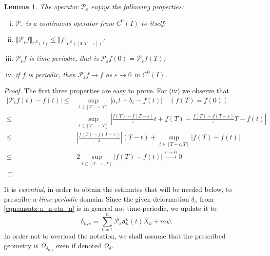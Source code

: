 \documentclass[10pt,a4paper]{article}
\newtheorem{lemma}[theorem]{Lemma}
\numberwithin{equation}{section}
\begin{document}
\begin{lemma}
The operator $\mathcal{P}_{\varepsilon}$ enjoys the following properties:
\begin{enumerate}[(i)]
\item $\mathcal{P}_{\varepsilon}$ is a continuous operator from $C^{0}(I)$ to itself;
    \item $\left\Vert \mathcal{P}_{\varepsilon}f\right\Vert _{C^{0}\left(I\right)}\le\left\Vert f\right\Vert _{C^{0}\left(\left[0,T-\varepsilon\right]\right)}$;
     \item $\mathcal{P}_{\varepsilon}f$ is time-periodic, that is $\mathcal{P}_{\varepsilon}f\left(0\right)=\mathcal{P}_{\varepsilon}f\left(T\right)$;
    \item  if $f$ is periodic, then $\mathcal{P}_{\varepsilon}f\to f$ as $\varepsilon\to 0$ in $C^{0}(I)$.

\end{enumerate}
\end{lemma}
\begin{proof}
    The first three properties are easy to prove. For (iv) we observe that 
    \begin{equation}
        \begin{aligned}\left|\mathcal{P}_{\varepsilon}f\left(t\right)-f\left(t\right)\right|\le & \sup_{t\in\left[T-\varepsilon,T\right]}\left|a_{\varepsilon}t+b_{\varepsilon}-f\left(t\right)\right|\quad\left(f\left(T\right)=f\left(0\right)\right)\\
\le & \sup_{t\in\left[T-\varepsilon,T\right]}\left|\frac{f\left(T\right)-f\left(T-\varepsilon\right)}{\varepsilon}t+f\left(T\right)-\frac{f\left(T\right)-f\left(T-\varepsilon\right)}{\varepsilon}T-f\left(t\right)\right|\\
\le & \left|\frac{f\left(T\right)-f\left(T-\varepsilon\right)}{\varepsilon}\right|\left(T-t\right)+\sup_{t\in\left[T-\varepsilon,T\right]}\left|f\left(T\right)-f\left(t\right)\right|\\
\le & 2\sup_{t\in\left[T-\varepsilon,T\right]}\left|f\left(T\right)-f\left(t\right)\right|\xrightarrow{\varepsilon\to0}0
\end{aligned}
    \end{equation}
\end{proof}

It is \emph{essential}, in order to obtain the estimates that will be needed below, to prescribe a \emph{time-periodic} domain. Since the given deformation $\delta_n$ from \eqref{eqn:ansatz-u_n-eta_n} is in general not time-periodic, we update it to 
\[
\delta_{n,\varepsilon}=\sum_{k=1}^{n}\mathcal{P}_{\varepsilon}\mathbf{a}_{n}^{k}\left(t\right)X_{k}+m\psi.
\]
In order not to overload the notation, we shall assume that the prescribed geometry is $\Omega_{\delta_{n,\varepsilon}}$ even if denoted $\Omega_{\delta}$.
\end{document}
